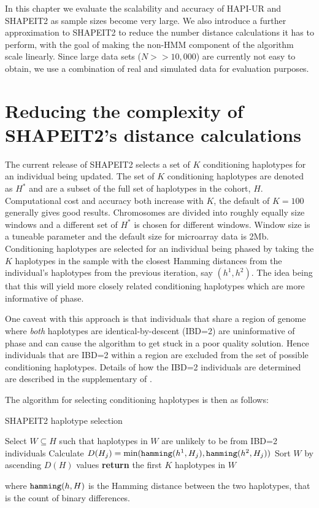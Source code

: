 In this chapter we evaluate the scalability and accuracy of HAPI-UR and SHAPEIT2 as sample sizes become very large.  We also introduce a further approximation to SHAPEIT2 to reduce the number distance calculations it has to perform, with the goal of making the non-HMM component of the algorithm scale linearly.  Since large data sets ($N>>10,000$) are currently not easy to obtain, we use a combination of real and simulated data for evaluation purposes.

\section{Reducing the complexity of SHAPEIT2's distance calculations}  
The current release of SHAPEIT2 selects a set of $K$ conditioning haplotypes for an individual being updated.  The set of $K$ conditioning haplotypes are denoted as  $H^{*}$ and are a subset of the  full set of haplotypes in the cohort, $H$. Computational cost and accuracy both increase with $K$, the default of $K=100$ generally gives good results. Chromosomes are divided into roughly equally size windows and  a different set of $H^{*}$ is chosen for different windows. Window size is a tuneable parameter and the default size for microarray data is 2Mb.  Conditioning haplotypes are selected for an individual being phased by taking the $K$ haplotypes in the sample with the closest Hamming distances from the individual's haplotypes from the previous iteration, say $(h^1,h^2)$. The idea being that this will yield more closely related conditioning haplotypes which are more informative of phase.

One caveat with this approach is that individuals that share a region of genome where \emph{both} haplotypes are identical-by-descent (IBD=2) are uninformative of phase and can cause the algorithm to get stuck in a poor quality solution.  Hence individuals that are  IBD=2 within a region are excluded from the set of possible conditioning haplotypes. Details of how the IBD=2 individuals are determined are described in the supplementary of \cite{delaneau2013}. 

The algorithm for selecting conditioning haplotypes is then as follows:

\vspace{10pt}
\begin{algorithm}
  \caption{SHAPEIT2 haplotype selection}
  \begin{algorithmic}[0]    
    \State Select $W\subseteq H$ such that haplotypes in $W$ are unlikely to be from IBD=2 individuals
    \State    Calculate $D(H_j) = \textrm{min}(\textrm{\texttt{hamming}}(h^1,H_j),\textrm{\texttt{hamming}}(h^2,H_j))$
    \EndFor
    \State    Sort $W$ by ascending $D(H)$ values    
    \State \textbf{return} the first $K$ haplotypes in $W$
  \end{algorithmic}
\end{algorithm}
where $\textrm{\texttt{hamming}}(h,H)$ is the Hamming distance between the two haplotypes, that is the count of binary differences.


